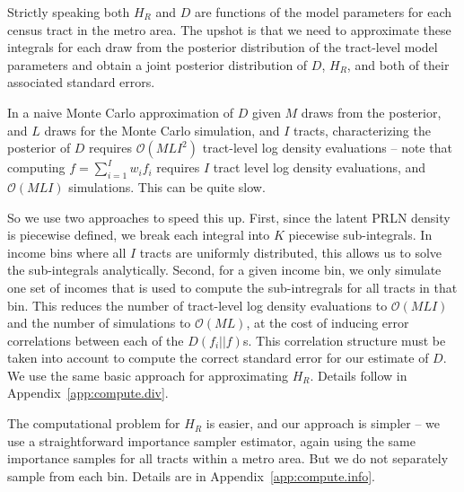 \documentclass[12pt]{article}
\begin{document}
Strictly speaking both $H_R$ and $D$ are functions of the model parameters for each census tract in the metro area. The upshot is that we need to approximate these integrals for each draw from the posterior distribution of the tract-level model parameters and obtain a joint posterior distribution of $D$, $H_R$, and both of their associated standard errors.

In a naive Monte Carlo approximation of $D$ given $M$ draws from the posterior, and $L$ draws for the Monte Carlo simulation, and $I$ tracts, characterizing the posterior of $D$ requires $\mathcal{O}(MLI^2)$ tract-level log density evaluations -- note that computing $f = \sum_{i=1}^Iw_if_i$ requires $I$ tract level log density evaluations, and $\mathcal{O}(MLI)$ simulations. This can be quite slow.

So we use two approaches to speed this up. First, since the latent PRLN density is piecewise defined, we break each integral into $K$ piecewise  sub-integrals. In income bins where all $I$ tracts are uniformly distributed, this allows us to solve the sub-integrals analytically. Second, for a given income bin, we only simulate one set of incomes that is used to compute the sub-intregrals for all tracts in that bin. This reduces the number of tract-level log density evaluations to $\mathcal{O}(MLI)$ and the number of simulations to $\mathcal{O}(ML)$, at the cost of inducing error correlations between each of the $D(f_i||f)$s. This correlation structure must be taken into account to compute the correct standard error for our estimate of $D$. We use the same basic approach for approximating $H_R$. Details follow in Appendix~\ref{app:compute.div}.

The computational problem for $H_R$ is easier, and our approach is simpler -- we use a straightforward importance sampler estimator, again using the same importance samples for all tracts within a metro area. But we do not separately sample from each bin. Details are in Appendix~\ref{app:compute.info}.
\end{document}
